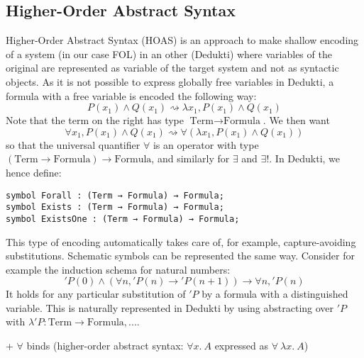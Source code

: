 \documentclass{article}
\newcommand{\Term}{\text{Term}}
\newcommand{\Formula}{\text{Formula}}
\begin{document}
	\subsection{Higher-Order Abstract Syntax}\label{SSect:HOAS}
	Higher-Order Abstract Syntax (HOAS) is an approach to make shallow encoding of a system (in our case FOL) in an other (Dedukti) where variables of the original are represented as variable of the target system and not as syntactic objects. As it is not possible to express globally free variables in Dedukti, a formula with a free variable is encoded the following way:
	$$
	P(x_1) \land Q(x_1) \rightsquigarrow \lambda x_1 ,  P(x_1) \land Q(x_1)
	$$
	Note that the term on the right has type $\Term \rightarrow \Formula$. We then want
	$$
	\forall x_1, P(x_1) \land Q(x_1) \rightsquigarrow \forall (\lambda x_1 ,  P(x_1) \land Q(x_1))
	$$
	so that the universal quantifier $\forall$ is an operator with type $(\Term \rightarrow \Formula) \rightarrow \Formula$, and similarly for $\exists$ and $\exists !$. In Dedukti, we hence define:
		\begin{lstlisting}[language=Dialekto]
symbol Forall : (Term → Formula) → Formula;
symbol Exists : (Term → Formula) → Formula;
symbol ExistsOne : (Term → Formula) → Formula;
\end{lstlisting}
This type of encoding automatically takes care of, for example, capture-avoiding substitutions. Schematic symbols can be represented the same way. Consider for example the induction schema for natural numbers:
$$
	'P(0) \land (\forall n, 'P(n) \rightarrow 'P(n+1)) \rightarrow \forall n, 'P(n)
$$
It holds for any particular substitution of $'P$ by a formula with a distinguished variable. This is naturally represented in Dedukti by using abstracting over $'P$ with $\lambda 'P: \Term\rightarrow\Formula, ...$.
	
	+ $\forall$ binds (higher-order abstract syntax: $\forall x.~A$ expressed as $\forall~\lambda x.~A$)
	
\end{document}
